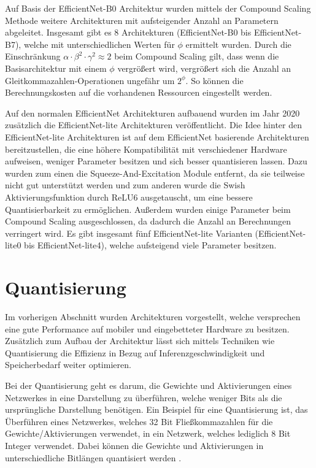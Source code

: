 Auf Basis der EfficientNet-B0 Architektur wurden mittels der Compound Scaling Methode weitere Architekturen mit aufsteigender Anzahl an Parametern abgeleitet. Insgesamt gibt es 8 Architekturen (EfficientNet-B0 bis EfficientNet-B7), welche mit unterschiedlichen Werten für $\phi$ ermittelt wurden. Durch die Einschränkung $\alpha \cdot \beta^2 \cdot \gamma^2 \approx 2$ beim Compound Scaling gilt, dass wenn die Basisarchitektur mit einem $\phi$ vergrößert wird, vergrößert sich die Anzahl an Gleitkommazahlen-Operationen ungefähr um $2^\phi$. So können die Berechnungskosten auf die vorhandenen Ressourcen eingestellt werden.

Auf den normalen EfficientNet Architekturen aufbauend wurden im Jahr 2020 zusätzlich die EfficientNet-lite \cite{liu_higher_2020} Architekturen veröffentlicht. Die Idee hinter den EfficientNet-lite Architekturen ist auf dem EfficientNet basierende Architekturen bereitzustellen, die eine höhere Kompatibilität mit verschiedener Hardware aufweisen, weniger Parameter besitzen und sich besser quantisieren lassen. Dazu wurden zum einen die Squeeze-And-Excitation Module entfernt, da sie teilweise nicht gut unterstützt werden und zum anderen wurde die Swish Aktivierungsfunktion durch ReLU6 ausgetauscht, um eine bessere Quantisierbarkeit zu ermöglichen. Außerdem wurden einige Parameter beim Compound Scaling ausgeschlossen, da dadurch die Anzahl an Berechnungen verringert wird. Es gibt insgesamt fünf EfficientNet-lite Varianten (EfficientNet-lite0 bis EfficientNet-lite4), welche aufsteigend viele Parameter besitzen.



\section{Quantisierung}
\label{quantisierung}
Im vorherigen Abschnitt wurden Architekturen vorgestellt, welche versprechen eine gute Performance auf mobiler und eingebetteter Hardware zu besitzen. Zusätzlich zum Aufbau der Architektur lässt sich mittels Techniken wie Quantisierung die Effizienz in Bezug auf Inferenzgeschwindigkeit und Speicherbedarf weiter optimieren.

Bei der Quantisierung geht es darum, die Gewichte und Aktivierungen eines Netzwerkes in eine Darstellung zu überführen, welche weniger Bits als die ursprüngliche Darstellung benötigen. Ein Beispiel für eine Quantisierung ist, das Überführen eines Netzwerkes, welches 32 Bit Fließkommazahlen für die Gewichte/Aktivierungen verwendet, in ein Netzwerk, welches lediglich 8 Bit Integer verwendet. Dabei können die Gewichte und Aktivierungen in unterschiedliche Bitlängen quantisiert werden \cite{jacob_quantization_2017}.

